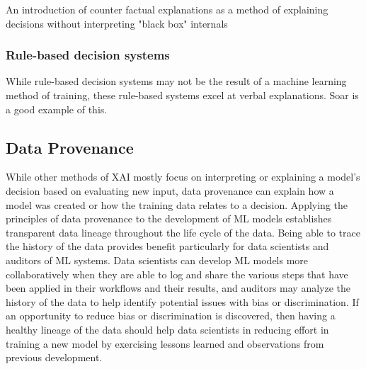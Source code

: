An introduction of counter factual explanations as a method of explaining decisions without interpreting "black box" internals \cite{DBLP:journals/corr/abs-1711-00399}

\subsubsection{Rule-based decision systems}

While rule-based decision systems may not be the result of a machine learning method of training, these rule-based systems excel at verbal explanations.  Soar is a good example of this.

\subsection{Data Provenance}

While other methods of XAI mostly focus on interpreting or explaining a model's decision based on evaluating new input, data provenance can explain how a model was created or how the training data relates to a decision.  Applying the principles of data provenance to the development of ML models establishes transparent data lineage throughout the life cycle of the data.  Being able to trace the history of the data provides benefit particularly for data scientists and auditors of ML systems.  Data scientists can develop ML models more collaboratively when they are able to log and share the various steps that have been applied in their workflows and their results, and auditors may analyze the history of the data to help identify potential issues with bias or discrimination.  If an opportunity to reduce bias or discrimination is discovered, then having a healthy lineage of the data should help data scientists in reducing effort in training a new model by exercising lessons learned and observations from previous development.

